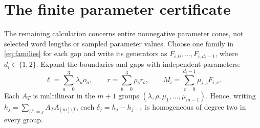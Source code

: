 \documentclass[11pt]{article}
\begin{document}
\section{The finite parameter certificate}

The remaining calculation concerns entire nonnegative parameter cones,
not selected word lengths or sampled parameter values.
Choose one family in \eqref{eq:families} for each gap and write its
generators as $F_{i,0},\ldots,F_{i,d_i-1}$, where $d_i\in\{1,2\}$.
Expand the boundaries and gaps with independent parameters:
\[
 \ell=\sum_{a=0}^3\lambda_a o_a,\qquad
 r=\sum_{b=0}^3\rho_b r_b,\qquad
 M_i=\sum_{c=0}^{d_i-1}\mu_{i,c}F_{i,c}.
\]
Each $A_T$ is multilinear in the $m+1$ groups
$(\lambda,\rho,\mu_1,\ldots,\mu_{m-1})$.
Hence, writing $h_j=\sum_{|T|=j}A_TA_{[m]\setminus T}$,
each $\delta_j=h_j-h_{j-1}$ is homogeneous of degree two in every group.
\end{document}
